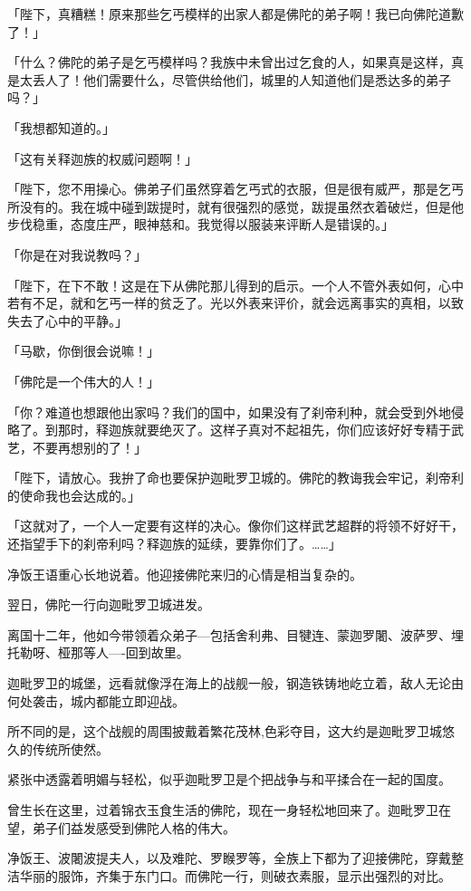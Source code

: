 \documentclass[twoside,openany]{book}
\begin{document}
「陛下，真糟糕！原来那些乞丐模样的出家人都是佛陀的弟子啊！我已向佛陀道歉了！」

「什么？佛陀的弟子是乞丐模样吗？我族中未曾出过乞食的人，如果真是这样，真是太丢人了！他们需要什么，尽管供给他们，城里的人知道他们是悉达多的弟子吗？」

「我想都知道的。」

「这有关释迦族的权威问题啊！」

「陛下，您不用操心。佛弟子们虽然穿着乞丐式的衣服，但是很有威严，那是乞丐所没有的。我在城中碰到跋提时，就有很强烈的感觉，跋提虽然衣着破烂，但是他步伐稳重，态度庄严，眼神慈和。我觉得以服装来评断人是错误的。」

「你是在对我说教吗？」

「陛下，在下不敢！这是在下从佛陀那儿得到的启示。一个人不管外表如何，心中若有不足，就和乞丐一样的贫乏了。光以外表来评价，就会远离事实的真相，以致失去了心中的平静。」

「马歇，你倒很会说嘛！」

「佛陀是一个伟大的人！」

「你？难道也想跟他出家吗？我们的国中，如果没有了刹帝利种，就会受到外地侵略了。到那时，释迦族就要绝灭了。这样子真对不起祖先，你们应该好好专精于武艺，不要再想别的了！」

「陛下，请放心。我拚了命也要保护迦毗罗卫城的。佛陀的教诲我会牢记，刹帝利的使命我也会达成的。」

「这就对了，一个人一定要有这样的决心。像你们这样武艺超群的将领不好好干，还指望手下的刹帝利吗？释迦族的延续，要靠你们了。……」

净饭王语重心长地说着。他迎接佛陀来归的心情是相当复杂的。

翌日，佛陀一行向迦毗罗卫城进发。

离国十二年，他如今带领着众弟子---包括舍利弗、目犍连、蒙迦罗闍、波萨罗、埋托勒呀、桠那等人----回到故里。

迦毗罗卫的城堡，远看就像浮在海上的战舰一般，钢造铁铸地屹立着，敌人无论由何处袭击，城内都能立即迎战。

所不同的是，这个战舰的周围披戴着繁花茂林,色彩夺目，这大约是迦毗罗卫城悠久的传统所使然。

紧张中透露着明媚与轻松，似乎迦毗罗卫是个把战争与和平揉合在一起的国度。

曾生长在这里，过着锦衣玉食生活的佛陀，现在一身轻松地回来了。迦毗罗卫在望，弟子们益发感受到佛陀人格的伟大。

净饭王、波闍波提夫人，以及难陀、罗睺罗等，全族上下都为了迎接佛陀，穿戴整洁华丽的服饰，齐集于东门口。而佛陀一行，则破衣素服，显示出强烈的对比。
\end{document}
